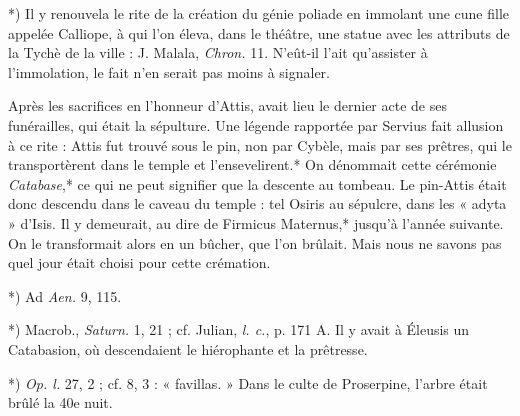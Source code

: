 \documentclass[a4paper, 11pt, oneside, polutonikogreek, french]{article}
\begin{document}
*) Il y renouvela le rite de la création du génie poliade en immolant une cune fille appelée Calliope, à qui l'on éleva, dans le théâtre, une statue avec les attributs de la Tychè de la ville : J. Malala, \emph{Chron.} 11. N'eût-il l'ait qu'assister à l'immolation, le fait n'en serait pas moins à signaler.

Après les sacrifices en l'honneur d'Attis, avait lieu le dernier acte de ses funérailles, qui était la sépulture. Une légende rapportée par Servius fait allusion à ce rite : Attis fut trouvé sous le pin, non par Cybèle, mais par ses prêtres, qui le transportèrent dans le temple et l'ensevelirent.* On dénommait cette cérémonie \emph{Catabase},* ce qui ne peut signifier que la descente au tombeau. Le pin-Attis était donc descendu dans le caveau du temple : tel Osiris au sépulcre, dans les « adyta » d'Isis. Il y demeurait, au dire de Firmicus Maternus,* jusqu'à l'année suivante. On le transformait alors en un bûcher, que l'on brûlait. Mais nous ne savons pas quel jour était choisi pour cette crémation.

*) Ad \emph{Aen.} 9, 115.

*) Macrob., \emph{Saturn.} 1, 21 ; cf. Julian, \emph{l. c.}, p. 171 A. Il y avait à Éleusis un Catabasion, où descendaient le hiérophante et la prêtresse.

*) \emph{Op. l.} 27, 2 ; cf. 8, 3 : « favillas. » Dans le culte de Proserpine, l'arbre était brûlé la 40e nuit.
\end{document}
